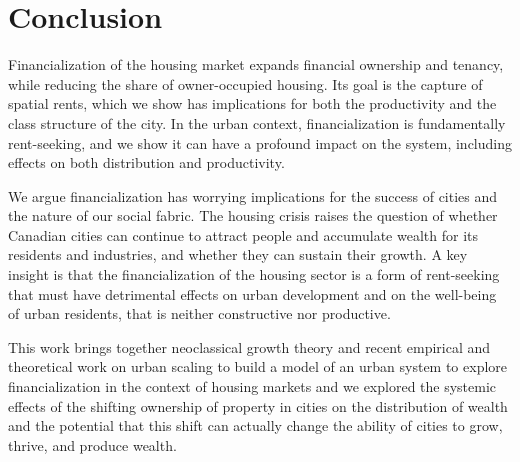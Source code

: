 \chapter{Conclusion} \label{chapter-conclusions}




Financialization of the housing market %
expands financial ownership and tenancy, while reducing the share of owner-occupied housing. Its goal is the capture of spatial rents, which we show has implications for both the productivity and the class structure of the city. 
In the urban context, financialization is fundamentally \gls{rent-seeking}, and we show it can have a profound impact on the system, including effects on both distribution and productivity. 


We argue financialization %
has worrying implications for the success of cities and the nature of our social fabric. 
The housing crisis raises the question of whether Canadian cities can continue to attract people and accumulate wealth for its residents and industries, and whether they can sustain their growth.
A key insight is that the financialization of the housing sector is a form of \gls{rent-seeking} that must have detrimental effects on urban development and on the well-being of urban residents, that is neither constructive nor productive.


This work brings together \gls{neoclassical growth theory} and recent empirical and theoretical work on \gls{urban scaling} to build a model of an urban system to explore financialization in the context of housing markets and we explored the systemic effects of the shifting ownership of property in cities on the distribution of wealth and the potential that this shift can actually change the ability of cities to grow, thrive, and produce wealth.




